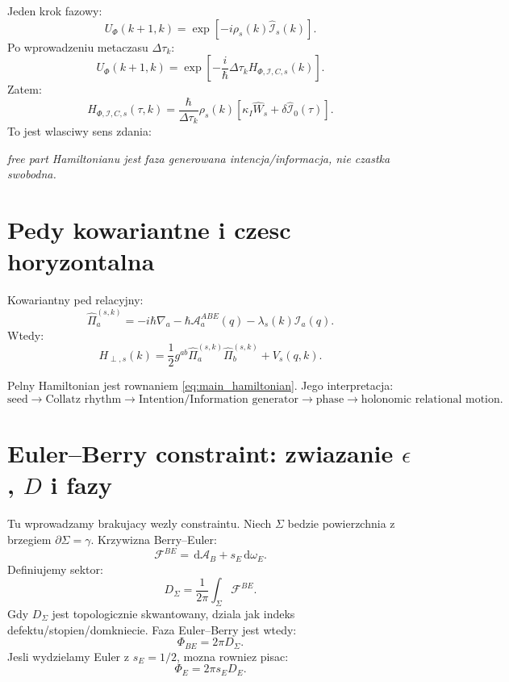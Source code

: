 \documentclass[11pt,a4paper]{article}
\newcommand{\Iop}{\hat{\mathcal I}}
\newcommand{\Wop}{\hat W}
\newcommand{\Abe}{\mathcal A^{ABE}}
\newcommand{\Fbe}{\mathcal F^{BE}}
\newcommand{\kappaI}{\kappa_I}
\newcommand{\dd}{\,\mathrm d}
\begin{document}
Jeden krok fazowy:
\begin{equation}
U_{\Phi}(k+1,k)
=
\exp\left[-i\rho_s(k)\Iop_s(k)\right].
\end{equation}
Po wprowadzeniu metaczasu $\Delta\tau_k$:
\begin{equation}
U_{\Phi}(k+1,k)
=
\exp\left[-\frac{i}{\hbar}\Delta\tau_k H_{\Phi,\mathcal I,C,s}(k)\right].
\end{equation}
Zatem:
\begin{equation}
\boxed{
H_{\Phi,\mathcal I,C,s}(\tau,k)
=
\frac{\hbar}{\Delta\tau_k}\rho_s(k)
\left[\kappaI\Wop_s+\delta\Iop_0(\tau)\right].}
\end{equation}
To jest wlasciwy sens zdania:
\begin{center}
\emph{free part Hamiltonianu jest faza generowana intencja/informacja, nie czastka swobodna.}
\end{center}

\section{Pedy kowariantne i czesc horyzontalna}

Kowariantny ped relacyjny:
\begin{equation}
\boxed{
\hat\Pi_a^{(s,k)}
=
-i\hbar\nabla_a
-\hbar\Abe_a(q)
-\lambda_s(k)\mathcal I_a(q).}
\end{equation}
Wtedy:
\begin{equation}
H_{\perp,s}(k)
=
\frac12g^{ab}\hat\Pi_a^{(s,k)}\hat\Pi_b^{(s,k)}+V_s(q,k).
\end{equation}

Pelny Hamiltonian jest rownaniem \eqref{eq:main_hamiltonian}. Jego interpretacja:
\begin{equation}
\boxed{
\text{seed}\rightarrow\text{Collatz rhythm}\rightarrow\text{Intention/Information generator}\rightarrow\text{phase}\rightarrow\text{holonomic relational motion}.}
\end{equation}

\section{Euler--Berry constraint: zwiazanie $\epsilon$, $D$ i fazy}

Tu wprowadzamy brakujacy wezly constraintu. Niech $\Sigma$ bedzie powierzchnia z brzegiem $\partial\Sigma=\gamma$. Krzywizna Berry--Euler:
\begin{equation}
\Fbe = \dd\mathcal A_B+s_E\dd\omega_E.
\end{equation}
Definiujemy sektor:
\begin{equation}
\boxed{
D_\Sigma
=
\frac{1}{2\pi}\int_\Sigma \Fbe.}
\end{equation}
Gdy $D_\Sigma$ jest topologicznie skwantowany, dziala jak indeks defektu/stopien/domkniecie. Faza Euler--Berry jest wtedy:
\begin{equation}
\Phi_{BE}=2\pi D_\Sigma.
\end{equation}
Jesli wydzielamy Euler z $s_E=1/2$, mozna rowniez pisac:
\begin{equation}
\Phi_E=2\pi s_E D_E.
\end{equation}
\end{document}
